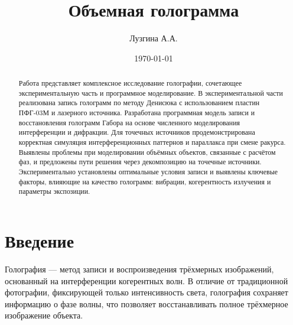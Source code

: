 \documentclass[aps,twocolumn,secnumarabic,balancelastpage,amsmath,amssymb,nofootinbib, floatfix]{revtex4-1}
\begin{document}
	\title{Объемная голограмма\\}
	\author{Лузгина А.А.}
	\date{\today}

	\begin{abstract}
		Работа представляет комплексное исследование голографии, сочетающее экспериментальную часть и программное моделирование. В экспериментальной части реализована запись голограмм по методу Денисюка с использованием пластин ПФГ-03М и лазерного источника. Разработана программная модель записи и восстановления голограмм Габора на основе численного моделирования интерференции и дифракции. Для точечных источников продемонстрирована корректная симуляция интерференционных паттернов и параллакса при смене ракурса. Выявлены проблемы при моделировании объёмных объектов, связанные с расчётом фаз, и предложены пути решения через декомпозицию на точечные источники. Экспериментально установлены оптимальные условия записи и выявлены ключевые факторы, влияющие на качество голограмм: вибрации, когерентность излучения и параметры экспозиции. 
	\end{abstract}
	
	\maketitle
	
	\section{Введение}  
	
	Голография — метод записи и воспроизведения трёхмерных изображений, основанный на интерференции когерентных волн. В отличие от традиционной фотографии, фиксирующей только интенсивность света, голография сохраняет информацию о фазе волны, что позволяет восстанавливать полное трёхмерное изображение объекта.  
	
\end{document}
